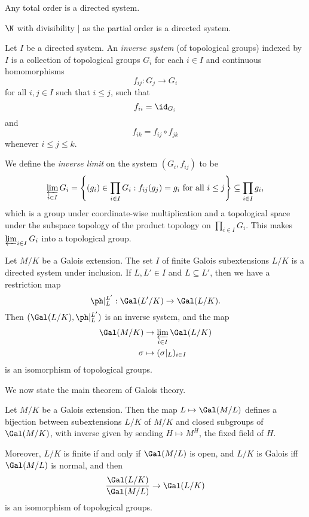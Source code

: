 \documentclass[a4paper]{article}
\begin{document}
\begin{eg}
  Any total order is a directed system.
\end{eg}

\begin{eg}
  $\N$ with divisibility $\mid$ as the partial order is a directed system.
\end{eg}

\begin{defi}
  Let $I$ be a directed system. An \emph{inverse system} (of topological groups) indexed by $I$ is a collection of topological groups $G_i$ for each $i \in I$ and continuous homomorphisms
  \[
    f_{ij}: G_j \to G_i
  \]
  for all $i, j \in I$ such that $i \leq j$, such that
  \[
    f_{ii} = \id_{G_i}
  \]
  and
  \[
    f_{ik} = f_{ij} \circ f_{jk}
  \]
  whenever $i \leq j \leq k$.

  We define the \emph{inverse limit} on the system $(G_i, f_{ij})$ to be
  \[
    \varprojlim_{i \in I} G_i = \left\{(g_i) \in \prod_{i \in I} G_i: f_{ij} (g_j) = g_i\text{ for all }i \leq j\right\} \subseteq \prod_{i \in I} g_i,
  \]
  which is a group under coordinate-wise multiplication and a topological space under the subspace topology of the product topology on $\prod_{i \in I} G_i$. This makes $\varprojlim_{i \in I} G_i$ into a topological group.
\end{defi}

\begin{prop}
  Let $M/K$ be a Galois extension. The set $I$ of finite Galois subextensions $L/K$ is a directed system under inclusion. If $L, L' \in I$ and $L \subseteq L'$, then we have a restriction map
  \[
    \ph |_L^{L'} : \Gal(L'/K) \to \Gal(L/K).
  \]
  Then $(\Gal(L/K), \ph|_L^{L'})$ is an inverse system, and the map
  \begin{align*}
    \Gal(M/K) &\to \varprojlim_{i \in I} \Gal(L/K)\\
    \sigma &\mapsto (\sigma|_L)_{i \in I}
  \end{align*}
  is an isomorphism of topological groups.
\end{prop}

We now state the main theorem of Galois theory.
\begin{thm}
  Let $M/K$ be a Galois extension. Then the map $L \mapsto \Gal(M/L)$ defines a bijection between subextensions $L/K$ of $M/K$ and closed subgroups of $\Gal(M/K)$, with inverse given by sending $H \mapsto M^H$, the fixed field of $H$.

  Moreover, $L/K$ is finite if and only if $\Gal(M/L)$ is open, and $L/K$ is Galois iff $\Gal(M/L)$ is normal, and then
  \[
    \frac{\Gal(L/K)}{\Gal(M/L)} \to \Gal(L/K)
  \]
  is an isomorphism of topological groups.
\end{thm}
\end{document}

